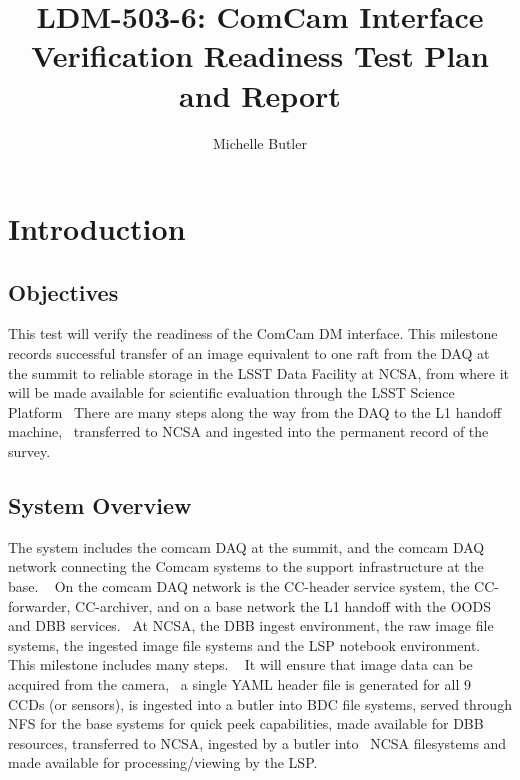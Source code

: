 \documentclass[DM,lsstdraft,STR,toc]{lsstdoc}
\begin{document}
\def\milestoneName{ComCam interface verification readiness}
\def\milestoneId{LDM-503-6}
\def\product{Data Management}


\title{LDM-503-6: ComCam Interface Verification Readiness Test Plan and Report}
\setDocRef{\lsstDocType-\lsstDocNum}
\date{\vcsdate}
\author{ Michelle Butler }






\maketitle

\section{Introduction}
\label{sect:intro}


\subsection{Objectives}
\label{sect:objectives}

This test will verify the readiness of the ComCam DM interface. This
milestone records successful transfer of an image equivalent to one raft
from the DAQ at the summit to reliable storage in the LSST Data Facility
at NCSA, from where it will be made available for scientific evaluation
through the LSST Science Platform ~There are many steps along the way
from the DAQ to the L1 handoff machine, ~transferred to NCSA and
ingested into the permanent record of the survey. ~~



\subsection{System Overview}
\label{sect:systemoverview}

The system includes the comcam DAQ at the summit, and the comcam DAQ
network connecting the Comcam systems to the support infrastructure at
the base. ~ On the comcam DAQ network is the CC-header service system,
the CC-forwarder, CC-archiver, and on a base network the L1 handoff with
the OODS and DBB services. ~At NCSA, the DBB ingest environment, the raw
image file systems, the ingested image file systems and the LSP notebook
environment. ~ This milestone includes many steps. ~ It will ensure that
image data can be acquired from the camera, ~a single YAML header file
is generated for all 9 CCDs (or sensors), is ingested into a butler into
BDC file systems, served through NFS for the base systems for quick peek
capabilities, made available for DBB resources, transferred to NCSA,
ingested by a butler into ~NCSA filesystems and made available for
processing/viewing by the LSP. ~\\[2\baselineskip]
\end{document}
